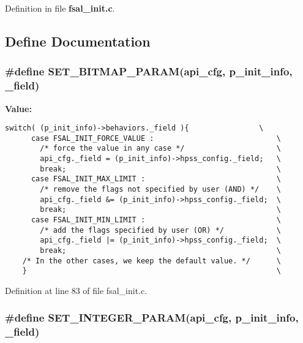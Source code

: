Definition in file {\bf fsal\_\-init.c}.

\subsection{Define Documentation}
\subsubsection[{SET\_\-BITMAP\_\-PARAM}]{\setlength{\rightskip}{0pt plus 5cm}\#define SET\_\-BITMAP\_\-PARAM(api\_\-cfg, \/  p\_\-init\_\-info, \/  \_\-field)}\label{fsal__init_8c_d4acf7e55a5ad7300edb9d27c5865001}


\textbf{Value:}

\begin{Code}\begin{verbatim}switch( (p_init_info)->behaviors._field ){                \
      case FSAL_INIT_FORCE_VALUE :                            \
        /* force the value in any case */                     \
        api_cfg._field = (p_init_info)->hpss_config._field;   \
        break;                                                \
      case FSAL_INIT_MAX_LIMIT :                              \
        /* remove the flags not specified by user (AND) */    \
        api_cfg._field &= (p_init_info)->hpss_config._field;  \
        break;                                                \
      case FSAL_INIT_MIN_LIMIT :                              \
        /* add the flags specified by user (OR) */            \
        api_cfg._field |= (p_init_info)->hpss_config._field;  \
        break;                                                \
    /* In the other cases, we keep the default value. */      \
    }                                                         \
\end{verbatim}
\end{Code}


Definition at line 83 of file fsal\_\-init.c.
\subsubsection[{SET\_\-INTEGER\_\-PARAM}]{\setlength{\rightskip}{0pt plus 5cm}\#define SET\_\-INTEGER\_\-PARAM(api\_\-cfg, \/  p\_\-init\_\-info, \/  \_\-field)}\label{fsal__init_8c_802153fcb81fd9f7b272dbf6eb477aec}


